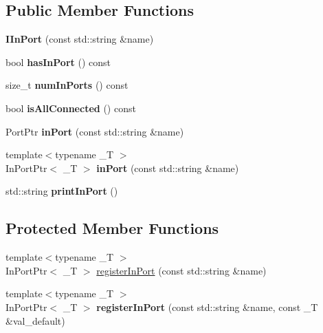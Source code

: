 \subsection*{Public Member Functions}
\begin{DoxyCompactItemize}
\item 
{\bfseries I\+In\+Port} (const std\+::string \&name)\hypertarget{classow_1_1IInPort_a0083b093069dc0a07f38af6f92b844af}{}\label{classow_1_1IInPort_a0083b093069dc0a07f38af6f92b844af}

\item 
bool {\bfseries has\+In\+Port} () const \hypertarget{classow_1_1IInPort_abd77977607ef1548d9b59f527e3ca0c2}{}\label{classow_1_1IInPort_abd77977607ef1548d9b59f527e3ca0c2}

\item 
size\+\_\+t {\bfseries num\+In\+Ports} () const \hypertarget{classow_1_1IInPort_adffd2c5d210e2f0c26f9f0f2c2091cac}{}\label{classow_1_1IInPort_adffd2c5d210e2f0c26f9f0f2c2091cac}

\item 
bool {\bfseries is\+All\+Connected} () const \hypertarget{classow_1_1IInPort_a2e3eb3be9159091fdf21df1cc805e042}{}\label{classow_1_1IInPort_a2e3eb3be9159091fdf21df1cc805e042}

\item 
Port\+Ptr {\bfseries in\+Port} (const std\+::string \&name)\hypertarget{classow_1_1IInPort_a0e8db75018060585c92c694008a9523c}{}\label{classow_1_1IInPort_a0e8db75018060585c92c694008a9523c}

\item 
{\footnotesize template$<$typename \+\_\+T $>$ }\\In\+Port\+Ptr$<$ \+\_\+T $>$ {\bfseries in\+Port} (const std\+::string \&name)\hypertarget{classow_1_1IInPort_a7c7abb60581754c542acd3319c1bd89f}{}\label{classow_1_1IInPort_a7c7abb60581754c542acd3319c1bd89f}

\item 
std\+::string {\bfseries print\+In\+Port} ()\hypertarget{classow_1_1IInPort_ad4da10b1192c3350d957a15ef5b376d4}{}\label{classow_1_1IInPort_ad4da10b1192c3350d957a15ef5b376d4}

\end{DoxyCompactItemize}
\subsection*{Protected Member Functions}
\begin{DoxyCompactItemize}
\item 
{\footnotesize template$<$typename \+\_\+T $>$ }\\In\+Port\+Ptr$<$ \+\_\+T $>$ \hyperlink{classow_1_1IInPort_a5a2fdccf8daeb7a96dc216334a3243e6}{register\+In\+Port} (const std\+::string \&name)
\item 
{\footnotesize template$<$typename \+\_\+T $>$ }\\In\+Port\+Ptr$<$ \+\_\+T $>$ {\bfseries register\+In\+Port} (const std\+::string \&name, const \+\_\+T \&val\+\_\+default)\hypertarget{classow_1_1IInPort_a3e29425eb0c32bb709a51f98352e64ff}{}\label{classow_1_1IInPort_a3e29425eb0c32bb709a51f98352e64ff}

\end{DoxyCompactItemize}


